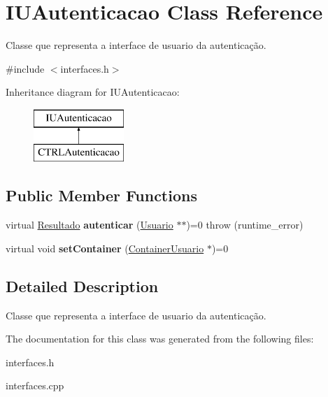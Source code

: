 \hypertarget{classIUAutenticacao}{}\section{I\+U\+Autenticacao Class Reference}
\label{classIUAutenticacao}


Classe que representa a interface de usuario da autenticação.  




{\ttfamily \#include $<$interfaces.\+h$>$}

Inheritance diagram for I\+U\+Autenticacao\+:\begin{figure}[H]
\begin{center}
\leavevmode
\includegraphics[height=2.000000cm]{classIUAutenticacao}
\end{center}
\end{figure}
\subsection*{Public Member Functions}
\begin{DoxyCompactItemize}
\item 
\mbox{\label{classIUAutenticacao_aad1e46db9061a785e3462a1f78d032f9}} 
virtual \hyperlink{classResultado}{Resultado} {\bfseries autenticar} (\hyperlink{classUsuario}{Usuario} $\ast$$\ast$)=0  throw (runtime\+\_\+error)
\item 
\mbox{\label{classIUAutenticacao_a86f10a01262f1ef6a6944bdb71aa6a88}} 
virtual void {\bfseries set\+Container} (\hyperlink{classContainerUsuario}{Container\+Usuario} $\ast$)=0
\end{DoxyCompactItemize}


\subsection{Detailed Description}
Classe que representa a interface de usuario da autenticação. 

The documentation for this class was generated from the following files\+:\begin{DoxyCompactItemize}
\item 
interfaces.\+h\item 
interfaces.\+cpp\end{DoxyCompactItemize}
